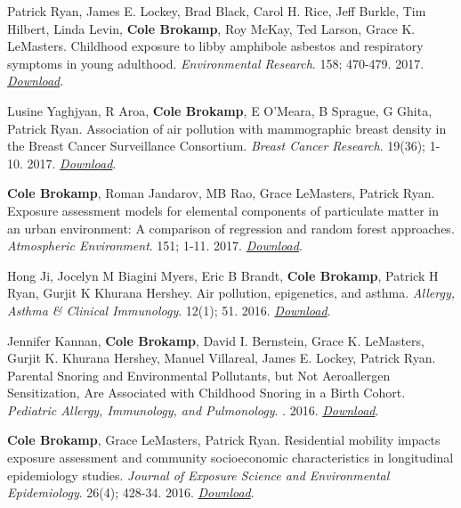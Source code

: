 Patrick Ryan, James E. Lockey, Brad Black, Carol H. Rice, Jeff Burkle,
Tim Hilbert, Linda Levin, \textbf{Cole Brokamp}, Roy McKay, Ted Larson,
Grace K. LeMasters. Childhood exposure to libby amphibole asbestos and
respiratory symptoms in young adulthood. \emph{Environmental Research}.
158; 470-479. 2017.
\href{http://colebrokamp-website.s3.amazonaws.com/publications/Ryan_EnvRes_2017.pdf}{\emph{Download}}.

Lusine Yaghjyan, R Aroa, \textbf{Cole Brokamp}, E O'Meara, B Sprague, G
Ghita, Patrick Ryan. Association of air pollution with mammographic
breast density in the Breast Cancer Surveillance Consortium.
\emph{Breast Cancer Research}. 19(36); 1-10. 2017.
\href{http://colebrokamp-website.s3.amazonaws.com/publications/Yaghjyan_2017_BreastCancerResearch.pdf}{\emph{Download}}.

\textbf{Cole Brokamp}, Roman Jandarov, MB Rao, Grace LeMasters, Patrick
Ryan. Exposure assessment models for elemental components of particulate
matter in an urban environment: A comparison of regression and random
forest approaches. \emph{Atmospheric Environment}. 151; 1-11. 2017.
\href{http://colebrokamp-website.s3.amazonaws.com/publications/Brokamp_AtmosEnv_2017.pdf}{\emph{Download}}.

Hong Ji, Jocelyn M Biagini Myers, Eric B Brandt, \textbf{Cole Brokamp},
Patrick H Ryan, Gurjit K Khurana Hershey. Air pollution, epigenetics,
and asthma. \emph{Allergy, Asthma \& Clinical Immunology}. 12(1); 51.
2016.
\href{http://colebrokamp-website.s3.amazonaws.com/publications/Ji_AllergyAsthmaClinImmunol_2016.pdf}{\emph{Download}}.

Jennifer Kannan, \textbf{Cole Brokamp}, David I. Bernstein, Grace K.
LeMasters, Gurjit K. Khurana Hershey, Manuel Villareal, James E. Lockey,
Patrick Ryan. Parental Snoring and Environmental Pollutants, but Not
Aeroallergen Sensitization, Are Associated with Childhood Snoring in a
Birth Cohort. \emph{Pediatric Allergy, Immunology, and Pulmonology}. .
2016.
\href{http://colebrokamp-website.s3.amazonaws.com/publications/Kannan_PedAllImmPul_2016.pdf}{\emph{Download}}.

\textbf{Cole Brokamp}, Grace LeMasters, Patrick Ryan. Residential
mobility impacts exposure assessment and community socioeconomic
characteristics in longitudinal epidemiology studies. \emph{Journal of
Exposure Science and Environmental Epidemiology}. 26(4); 428-34. 2016.
\href{http://colebrokamp-website.s3.amazonaws.com/publications/Brokamp_JESEE_2016.pdf}{\emph{Download}}.

